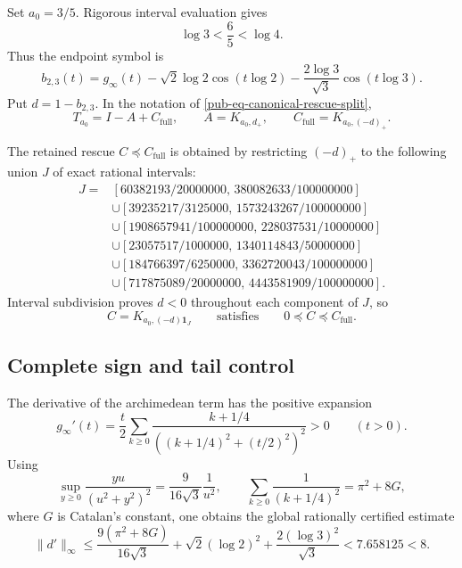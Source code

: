 \documentclass[11pt]{article}
\theoremstyle{remark}
\begin{document}
Set \(a_0=3/5\).
Rigorous interval evaluation gives
\begin{equation}
             \log3<\frac65<\log4.
\label{pub-eq-cell-inequalities}
\end{equation}
Thus the endpoint symbol is
\begin{equation}
 b_{2,3}(t)=g_\infty(t)
 -\sqrt2\log2\cos(t\log2)
 -\frac{2\log3}{\sqrt3}\cos(t\log3).
\label{pub-eq-b23}
\end{equation}
Put \(d=1-b_{2,3}\).
In the notation of \eqref{pub-eq-canonical-rescue-split},
\begin{equation}
 T_{a_0}=I-A+C_{\mathrm{full}},
 \qquad A=K_{a_0,d_+},
 \qquad C_{\mathrm{full}}=K_{a_0,(-d)_+}.
\label{pub-eq-endpoint-full-split}
\end{equation}

The retained rescue \(C\preceq C_{\mathrm{full}}\) is obtained by restricting \((-d)_+\) to the following union \(J\) of exact rational intervals:
\begin{equation}
\begin{split}
J={}&[60382193/20000000,\,380082633/100000000]\\
&\cup[39235217/3125000,\,1573243267/100000000]\\
&\cup[1908657941/100000000,\,228037531/10000000]\\
&\cup[23057517/1000000,\,1340114843/50000000]\\
&\cup[184766397/6250000,\,3362720043/100000000]\\
&\cup[717875089/20000000,\,4443581909/100000000].
\end{split}
\label{pub-eq-rescue-cores}
\end{equation}
Interval subdivision proves \(d<0\) throughout each component of \(J\), so
\begin{equation}
 C=K_{a_0,(-d)\mathbf1_J}
 \qquad\text{satisfies}\qquad 0\preceq C\preceq C_{\mathrm{full}}.
\label{pub-eq-retained-C}
\end{equation}

\subsection{Complete sign and tail control}

The derivative of the archimedean term has the positive expansion
\begin{equation}
 g_\infty'(t)=\frac t2\sum_{k\geq0}
 \frac{k+1/4}{((k+1/4)^2+(t/2)^2)^2}>0
 \qquad(t>0).
\label{pub-eq-g-derivative}
\end{equation}
Using
\[
 \sup_{y\geq0}\frac{yu}{(u^2+y^2)^2}
 =\frac{9}{16\sqrt3}\frac1{u^2},
 \qquad
 \sum_{k\geq0}\frac1{(k+1/4)^2}=\pi^2+8G,
\]
where \(G\) is Catalan's constant, one obtains the global rationally certified estimate
\begin{equation}
 \lVert d'\rVert_\infty
 \leq\frac{9(\pi^2+8G)}{16\sqrt3}
 +\sqrt2(\log2)^2+\frac{2(\log3)^2}{\sqrt3}
 <7.658125<8.
\label{pub-eq-lipschitz-eight}
\end{equation}
\end{document}
